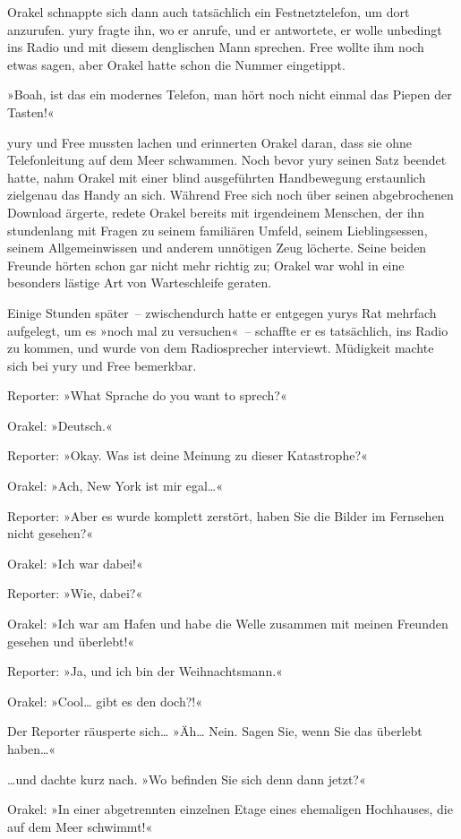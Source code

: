 Orakel schnappte sich dann auch tatsächlich ein Festnetztelefon, um dort anzurufen. yury fragte ihn, wo er anrufe, und er antwortete, er wolle unbedingt ins Radio und mit diesem denglischen Mann sprechen. Free wollte ihm noch etwas sagen, aber Orakel hatte schon die Nummer eingetippt.

»Boah, ist das ein modernes Telefon, man hört noch nicht einmal das Piepen der Tasten!«

yury und Free mussten lachen und erinnerten Orakel daran, dass sie ohne Telefonleitung auf dem Meer schwammen. Noch bevor yury seinen Satz beendet hatte, nahm Orakel mit einer blind ausgeführten Handbewegung erstaunlich zielgenau das Handy an sich. Während Free sich noch über seinen abgebrochenen Download ärgerte, redete Orakel bereits mit irgendeinem Menschen, der ihn stundenlang mit Fragen zu seinem familiären Umfeld, seinem Lieblingsessen, seinem Allgemeinwissen und anderem unnötigen Zeug löcherte. Seine beiden Freunde hörten schon gar nicht mehr richtig zu; Orakel war wohl in eine besonders lästige Art von Warteschleife geraten.

Einige Stunden später~– zwischendurch hatte er entgegen yurys Rat mehrfach aufgelegt, um es »noch mal zu versuchen«~– schaffte er es tatsächlich, ins Radio zu kommen, und wurde von dem Radiosprecher interviewt. Müdigkeit machte sich bei yury und Free bemerkbar.

Reporter: »What Sprache do you want to sprech?«

Orakel: »Deutsch.«

Reporter: »Okay. Was ist deine Meinung zu dieser Katastrophe?«

Orakel: »Ach, New York ist mir egal…«

Reporter: »Aber es wurde komplett zerstört, haben Sie die Bilder im Fernsehen nicht gesehen?«

Orakel: »Ich war dabei!«

Reporter: »Wie, dabei?«

Orakel: »Ich war am Hafen und habe die Welle zusammen mit meinen Freunden gesehen und überlebt!«

Reporter: »Ja, und ich bin der Weihnachtsmann.«

Orakel: »Cool… gibt es den doch?!«

Der Reporter räusperte sich… »Äh… Nein. Sagen Sie, wenn Sie das überlebt haben…«

…und dachte kurz nach. »Wo befinden Sie sich denn dann jetzt?«

Orakel: »In einer abgetrennten einzelnen Etage eines ehemaligen Hochhauses, die auf dem Meer schwimmt!«

